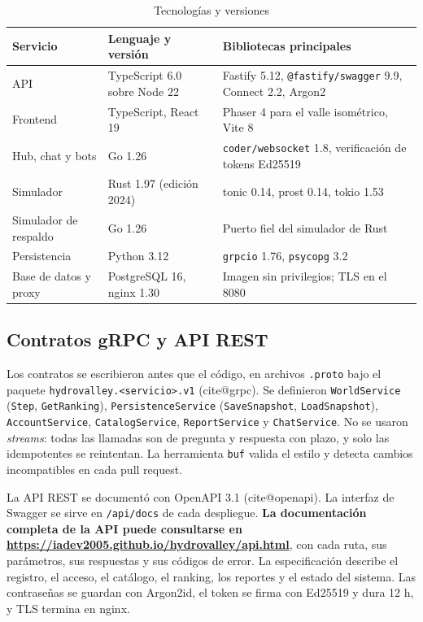 \documentclass[11pt,letterpaper]{article}
\makeatletter
\newcommand{\parencite}[1]{(\csname cite@#1\endcsname)}
\newcommand{\site}{https://iadev2005.github.io/hydrovalley}
\makeatother
\begin{document}
\begin{table}[H]
\centering\small
\caption{Tecnologías y versiones}
\label{tab:tec}
\begin{tabularx}{\textwidth}{@{}llY@{}}
\toprule
Servicio & Lenguaje y versión & Bibliotecas principales \\
\midrule
API & TypeScript 6.0 sobre Node 22 & Fastify 5.12, \texttt{@fastify/swagger} 9.9, Connect 2.2, Argon2 \\
Frontend & TypeScript, React 19 & Phaser 4 para el valle isométrico, Vite 8 \\
Hub, chat y bots & Go 1.26 & \texttt{coder/websocket} 1.8, verificación de tokens Ed25519 \\
Simulador & Rust 1.97 (edición 2024) & tonic 0.14, prost 0.14, tokio 1.53 \\
Simulador de respaldo & Go 1.26 & Puerto fiel del simulador de Rust \\
Persistencia & Python 3.12 & \texttt{grpcio} 1.76, \texttt{psycopg} 3.2 \\
Base de datos y proxy & PostgreSQL 16, nginx 1.30 & Imagen sin privilegios; TLS en el 8080 \\
\bottomrule
\end{tabularx}
\end{table}

\subsection{Contratos gRPC y API REST}

Los contratos se escribieron antes que el código, en archivos \texttt{.proto} bajo el paquete \texttt{hydrovalley.<servicio>.v1} \parencite{grpc}. Se definieron \texttt{WorldService} (\texttt{Step}, \texttt{GetRanking}), \texttt{PersistenceService} (\texttt{SaveSnapshot}, \texttt{LoadSnapshot}), \texttt{AccountService}, \texttt{CatalogService}, \texttt{ReportService} y \texttt{ChatService}. No se usaron \textit{streams}: todas las llamadas son de pregunta y respuesta con plazo, y solo las idempotentes se reintentan. La herramienta \texttt{buf} valida el estilo y detecta cambios incompatibles en cada pull request.
{\sloppy \par}
La API REST se documentó con OpenAPI 3.1 \parencite{openapi}. La interfaz de Swagger se sirve en \texttt{/api/docs} de cada despliegue. \textbf{La documentación completa de la API puede consultarse en \url{\site/api.html}}, con cada ruta, sus parámetros, sus respuestas y sus códigos de error. La especificación describe el registro, el acceso, el catálogo, el ranking, los reportes y el estado del sistema. Las contraseñas se guardan con Argon2id, el token se firma con Ed25519 y dura 12 h, y TLS termina en nginx.
\end{document}

